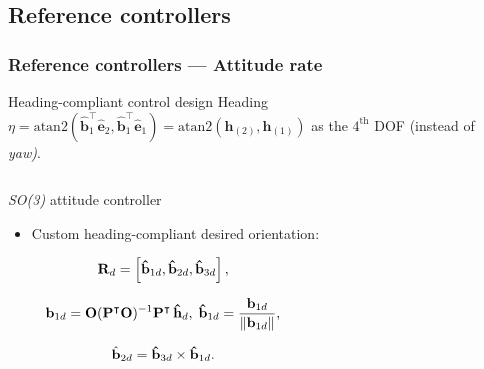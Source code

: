 \documentclass[aspectratio=169,9pt]{beamer}
\begin{document}
\subsection{Reference controllers}



\begin{frame}
\frametitle{Reference controllers --- Attitude rate}

\begin{block}{\small Heading-compliant control design}
  \small Heading $\eta = \mathrm{atan2}\left(\mathbf{\hat{b}}_1^\intercal\mathbf{\hat{e}}_2, \mathbf{\hat{b}}_1^\intercal\mathbf{\hat{e}}_1\right) = \mathrm{atan2}\left(\mathbf{h}_{(2)}, \mathbf{h}_{(1)}\right)$ as the $4^{\mathrm{th}}$ DOF (instead of \emph{yaw)}.
\end{block}

\begin{columns}[c]


\begin{block}{\small \emph{SO(3)} attitude controller \cite{lee2010geometric}}
  \begin{itemize}
    \item \scriptsize Custom heading-compliant desired orientation:
  \end{itemize}

  \begin{equation}
    \scriptsize
    \mathbf{R}_d = \left[\mathbf{\hat{b}}_{1d}, \mathbf{\hat{b}}_{2d}, \mathbf{\hat{b}}_{3d}\right],
  \end{equation}

  \begin{equation}
    \scriptsize
    \mathbf{b}_{1d} = \mathbf{O}(\mathbf{P}^\intercal\mathbf{O})^{-1}\mathbf{P}^\intercal\,\mathbf{\hat{h}}_d,\ \mathbf{\hat{b}}_{1d} = \frac{\mathbf{b}_{1d}}{\|\mathbf{b}_{1d}\|},
  \end{equation}

  \begin{equation}
    \scriptsize
    \hat{\mathbf{b}}_{2d} = \mathbf{\hat{b}}_{3d}\times \mathbf{\hat{b}}_{1d}.
  \end{equation}

\end{block}



\end{columns}
\end{frame}
\end{document}
